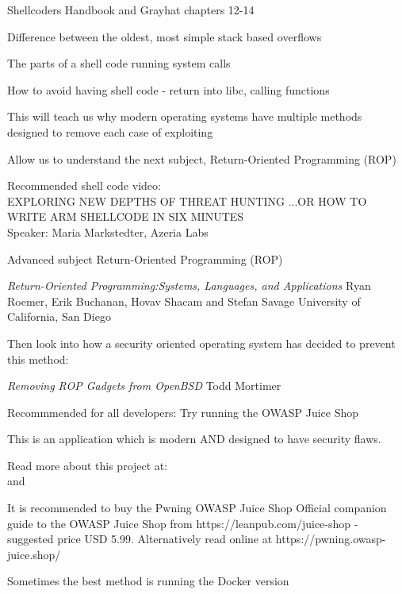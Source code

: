 \documentclass[Screen16to9,17pt]{foils}
\begin{document}

\begin{list1}
\item Shellcoders Handbook  and Grayhat chapters 12-14
\item Difference between the oldest, most simple stack based overflows
\item The parts of a shell code running system calls
\item How to avoid having shell code - return into libc, calling functions
\item This will teach us why modern operating systems have multiple methods designed to remove each case of exploiting
\item Allow us to understand the next subject, Return-Oriented Programming (ROP)
\end{list1}

Recommended shell code video:\\
EXPLORING NEW DEPTHS OF THREAT HUNTING ...OR HOW TO WRITE ARM SHELLCODE IN SIX MINUTES\\
Speaker: Maria Markstedter, Azeria Labs\\



\begin{list1}
\item Advanced subject Return-Oriented Programming (ROP)
\item \emph{Return-Oriented Programming:Systems, Languages, and Applications}
Ryan Roemer, Erik Buchanan, Hovav Shacam and Stefan Savage University of California, San Diego\\
\item Then look into how a security oriented operating system has decided to prevent this method:
\item \emph{Removing ROP Gadgets from OpenBSD}
Todd Mortimer\\
\end{list1}


\begin{list1}
\item Recommmended for all developers: Try running the OWASP Juice Shop
\item This is an application which is modern AND designed to have security flaws.
\item Read more about this project at:\\
 and\\ 
\item It is recommended to buy the Pwning OWASP Juice Shop Official companion guide to the OWASP Juice Shop from https://leanpub.com/juice-shop - suggested price USD 5.99. Alternatively read online at https://pwning.owasp-juice.shop/
\item Sometimes the best method is running the Docker version
\end{list1}
\end{document}

